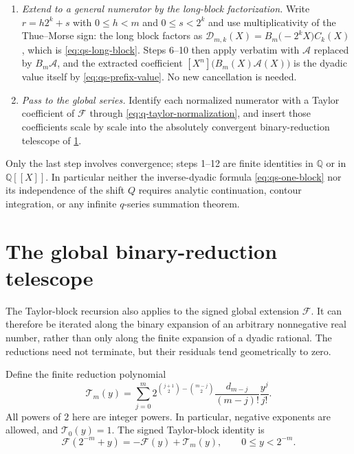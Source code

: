 \documentclass[11pt,oneside]{article}
\theoremstyle{definition}
\theoremstyle{remark}
\newcommand{\Q}{\mathbb Q}
\begin{document}
\begin{enumerate}
\item \emph{Extend to a general numerator by the long-block factorization.}  Write
$r=h2^k+s$ with $0\le h<m$ and $0\le s<2^k$ and use multiplicativity of the Thue--Morse
sign: the long block factors as
$\mathscr D_{m,k}(X)=B_m\bigl(-2^kX\bigr)C_k(X)$, which is \eqref{eq:qs-long-block}.  Steps
6--10 then apply verbatim with $\mathscr A$ replaced by $B_m\mathscr A$, and the extracted
coefficient $[X^n]\bigl(B_m(X)\mathscr A(X)\bigr)$ is the dyadic value itself by
\eqref{eq:qs-prefix-value}.  No new cancellation is needed.

\item \emph{Pass to the global series.}  Identify each normalized numerator with a Taylor
coefficient of $\mathcal F$ through \eqref{eq:q-taylor-normalization}, and insert those
coefficients scale by scale into the absolutely convergent binary-reduction telescope of
\cref{sec:global-binary-reduction}.
\end{enumerate}

Only the last step involves convergence; steps 1--12 are finite identities in $\Q$ or in
$\Q[[X]]$.  In particular neither the inverse-dyadic formula
\eqref{eq:qs-one-block} nor its independence of the shift $Q$ requires analytic
continuation, contour integration, or any infinite $q$-series summation theorem.

\section{The global binary-reduction telescope}
\label{sec:global-binary-reduction}

The Taylor-block recursion also applies to the signed global extension $\mathcal F$.  It can
therefore be iterated along the binary expansion of an arbitrary nonnegative real number,
rather than only along the finite expansion of a dyadic rational.  The reductions need not
terminate, but their residuals tend geometrically to zero.

Define the finite reduction polynomial
\begin{equation}
 \mathcal T_m(y)=
 \sum_{j=0}^{m}
 2^{\binom{j+1}{2}-\binom{m-j}{2}}
 \frac{d_{m-j}}{(m-j)!}\frac{y^j}{j!}.                   \label{eq:global-reduction-polynomial}
\end{equation}
All powers of $2$ here are integer powers.  In particular, negative exponents are allowed,
and $\mathcal T_0(y)=1$.  The signed Taylor-block identity is
\begin{equation}
 \mathcal F(2^{-m}+y)=-\mathcal F(y)+\mathcal T_m(y),
 \qquad 0\le y<2^{-m}.                                   \label{eq:global-taylor-reduction}
\end{equation}
\end{document}
